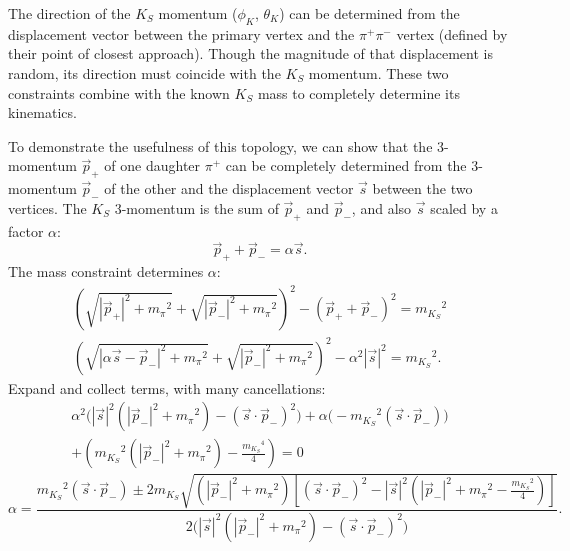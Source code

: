 \documentclass[12pt]{article}
\begin{document}
The direction of the $K_S$ momentum ($\phi_K$, $\theta_K$) can be
determined from the displacement vector between the primary vertex and
the $\pi^+\pi^-$ vertex (defined by their point of closest approach).
Though the magnitude of that displacement is random, its direction
must coincide with the $K_S$ momentum.  These two constraints combine
with the known $K_S$ mass to completely determine its kinematics.

To demonstrate the usefulness of this topology, we can show that the
3-momentum $\vec{p}_+$ of one daughter $\pi^+$ can be completely
determined from the 3-momentum $\vec{p}_-$ of the other and the
displacement vector $\vec{s}$ between the two vertices.  The $K_S$
3-momentum is the sum of $\vec{p}_+$ and $\vec{p}_-$, and also
$\vec{s}$ scaled by a factor $\alpha$:
\begin{equation}
\vec{p}_+ + \vec{p}_- = \alpha \vec{s}\mbox{.}
\end{equation}
The mass constraint determines $\alpha$:
\begin{eqnarray}
\left(\sqrt{|\vec{p}_+|^2 + {m_\pi}^2} + \sqrt{|\vec{p}_-|^2 + {m_\pi}^2}\right)^2 - \left(\vec{p}_+ + \vec{p}_-\right)^2 = {m_{K_S}}^2 \\
\left(\sqrt{|\alpha \vec{s} - \vec{p}_-|^2 + {m_\pi}^2} + \sqrt{|\vec{p}_-|^2 + {m_\pi}^2}\right)^2 - \alpha^2 |\vec{s}|^2 = {m_{K_S}}^2\mbox{.}
\end{eqnarray}
Expand and collect terms, with many cancellations:
\begin{multline}
\alpha^2 \bigg(|\vec{s}|^2\left(|\vec{p}_-|^2 + {m_\pi}^2\right) - \left(\vec{s} \cdot \vec{p}_-\right)^2\bigg)
+ \alpha \bigg(-{m_{K_S}}^2 \left(\vec{s} \cdot \vec{p}_-\right) \bigg) \\
+ \left({m_{K_S}}^2 \left(|\vec{p}_-|^2 + {m_\pi}^2\right) - \frac{{m_{K_S}}^4}{4}\right) = 0
\end{multline}
\begin{equation}
\alpha = \frac{{m_{K_S}}^2 \left(\vec{s} \cdot \vec{p}_-\right) \pm 2 m_{K_S} \sqrt{\left(|\vec{p}_-|^2 + {m_\pi}^2\right)
\left[\left(\vec{s} \cdot \vec{p}_-\right)^2 - |\vec{s}|^2 \left(|\vec{p}_-|^2 + {m_\pi}^2 - \frac{{m_{K_S}}^2}{4} \right)\right]}}
{2 \bigg(|\vec{s}|^2 \left(|\vec{p}_-|^2 + {m_\pi}^2\right) - \left(\vec{s} \cdot \vec{p}_-\right)^2\bigg)}\mbox{.}
\end{equation}
\end{document}
